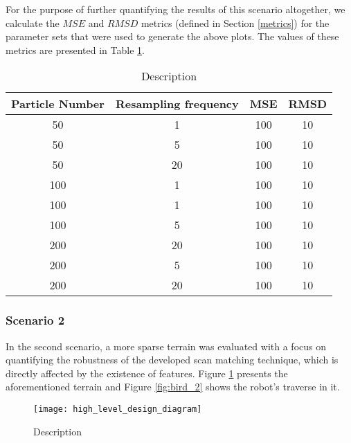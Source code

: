 For the purpose of further quantifying the results of this scenario altogether,
we calculate the $MSE$ and $RMSD$ metrics (defined in Section \ref{metrics})
for the parameter sets that were used to generate the above plots.
The values of these metrics are presented in Table \ref{table:metrics_1}.

\begin{table}
    \centering
    \begin{tabular}{| c | c || c | c |}
        \hline
        Particle Number & Resampling frequency & MSE & RMSD \\
        \hline
        \hline
        50 & 1 & 100 & 10 \\
        50 & 5 & 100 & 10 \\
        50 & 20 & 100 & 10 \\
        100 & 1 & 100 & 10 \\
        100 & 1 & 100 & 10 \\
        100 & 5 & 100 & 10 \\
        200 & 20 & 100 & 10 \\
        200 & 5 & 100 & 10 \\
        200 & 20 & 100 & 10 \\
        \hline
    \end{tabular}
    \caption[Name]{
        Description
    }
    \label{table:metrics_1}
\end{table}


\subsubsection{Scenario 2}

In the second scenario, a more sparse terrain was evaluated with a focus on
quantifying the robustness of the developed scan matching technique, which
is directly affected by the existence of features.
Figure \ref{fig:terrain_2} presents the aforementioned terrain and
Figure \ref{fig:bird_2} shows the robot's traverse in it.

\begin{figure}
    \centering
    \texttt{[image: high\_level\_design\_diagram]}
    \caption[Name]{
        Description
    }
    \label{fig:terrain_2}
\end{figure}

